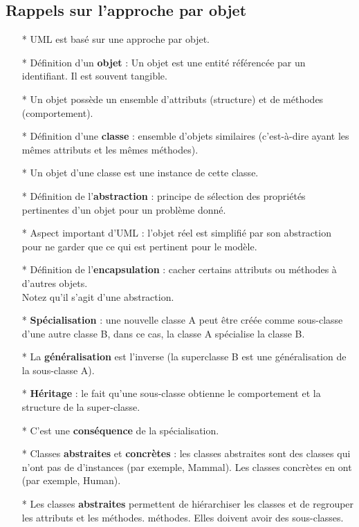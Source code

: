\documentclass[12pt]{article}
\begin{document}
\subsection{Rappels sur l'approche par objet}
\begin{itemize}
	\item[*] UML est basé sur une approche par objet.
	\item[*]  Définition d'un \textbf{objet} : Un objet est une entité référencée par un identifiant. Il est
	souvent tangible.
	\item[*] Un objet possède un ensemble d'attributs (structure) et de méthodes (comportement).
	\item [*] Définition d'une \textbf{classe}  : ensemble d'objets similaires (c'est-à-dire ayant les mêmes attributs et
	les mêmes méthodes).
	\item [*] Un objet d'une classe est une instance de cette classe.
	\item [*] Définition de l'\textbf{abstraction} : principe de sélection des propriétés pertinentes d'un objet pour un problème donné.
	\item [*] Aspect important d'UML : l'objet réel est simplifié par son abstraction pour ne garder que ce qui est pertinent pour le modèle.
	\item [*] Définition de l'\textbf{encapsulation} : cacher certains attributs ou méthodes à d'autres objets.\\
	Notez qu'il s'agit d'une abstraction.
	\item [*]  \textbf{Spécialisation} : une nouvelle classe A peut être créée comme sous-classe d'une autre classe B,
	dans ce cas, la classe A spécialise la classe B.
	\item [*] La \textbf{généralisation} est l'inverse (la superclasse B est une généralisation de la sous-classe A).
	\item [*] \textbf{Héritage} : le fait qu'une sous-classe obtienne le comportement et la structure de la super-classe.
	\item [*] C'est une \textbf{conséquence} de la spécialisation.
	\item[*]  Classes \textbf{abstraites} et \textbf{concrètes} : les classes abstraites sont des classes qui n'ont pas de
	d'instances (par exemple, Mammal). Les classes concrètes en ont (par exemple, Human).
	\item [*] Les classes \textbf{abstraites} permettent de hiérarchiser les classes et de regrouper les attributs et les méthodes.
	méthodes. Elles doivent avoir des sous-classes.

\end{itemize}
\end{document}
